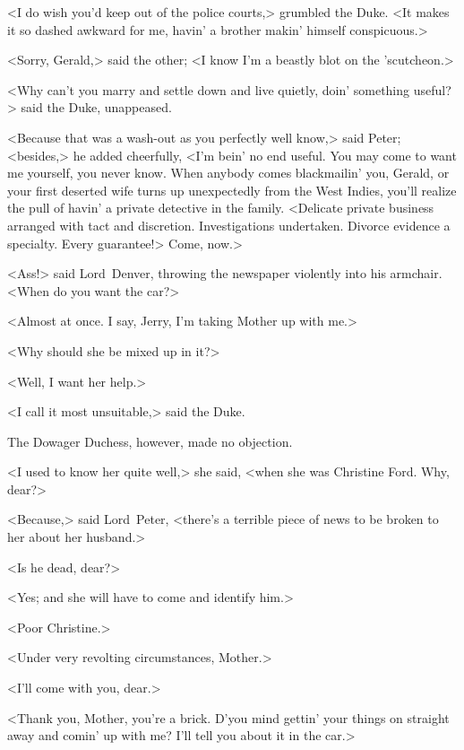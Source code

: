 <I do wish you'd keep out of the police courts,> grumbled the Duke. <It makes it so dashed awkward for me, havin' a brother makin' himself conspicuous.>

<Sorry, Gerald,> said the other; <I know I'm a beastly blot on the 'scutcheon.>

<Why can't you marry and settle down and live quietly, doin' something useful?> said the Duke, unappeased.

<Because that was a wash-out as you perfectly well know,> said Peter; <besides,> he added cheerfully, <I'm bein' no end useful. You may come to want me yourself, you never know. When anybody comes blackmailin' you, Gerald, or your first deserted wife turns up unexpectedly from the West Indies, you'll realize the pull of havin' a private detective in the family. <Delicate private business arranged with tact and discretion. Investigations undertaken. Divorce evidence a specialty. Every guarantee!> Come, now.>

<Ass!> said Lord~Denver, throwing the newspaper violently into his armchair. <When do you want the car?>

<Almost at once. I say, Jerry, I'm taking Mother up with me.>

<Why should she be mixed up in it?>

<Well, I want her help.>

<I call it most unsuitable,> said the Duke.

The Dowager Duchess, however, made no objection.

<I used to know her quite well,> she said, <when she was Christine Ford. Why, dear?>

<Because,> said Lord~Peter, <there's a terrible piece of news to be broken to her about her husband.>

<Is he dead, dear?>

<Yes; and she will have to come and identify him.>

<Poor Christine.>

<Under very revolting circumstances, Mother.>

<I'll come with you, dear.>

<Thank you, Mother, you're a brick. D'you mind gettin' your things on straight away and comin' up with me? I'll tell you about it in the car.>